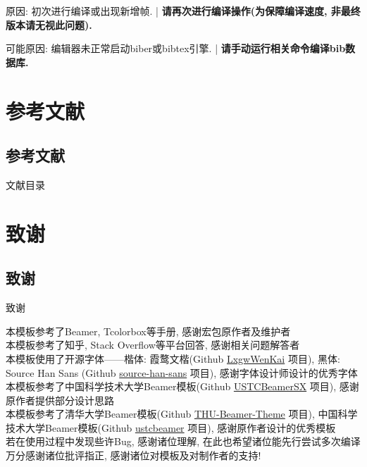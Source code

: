 \documentclass[hyperref, UTF8, CJK, aspectratio=169]{beamer}
\begin{document}
\begin{frame}[allowframebreaks]
  \par
  原因: 初次进行编译或出现新增帧. | \textbf{请再次进行编译操作(为保障编译速度, 非最终版本请无视此问题).}\par\vspace{2ex}
  \par
  可能原因: 编辑器未正常启动biber或bibtex引擎. | \textbf{请手动运行相关命令编译bib数据库.}\par\vspace{2ex}
\end{frame}

\section{参考文献}
\subsection{参考文献}
\begin{frame}[allowframebreaks]{文献目录}
	\nocite{*}
	\printbibliography[heading=none]
\end{frame}

\section{致谢}
\subsection{致谢}
\begin{frame}{致谢}
	\begin{center}
		本模板参考了Beamer, Tcolorbox等手册, 感谢宏包原作者及维护者\\[1ex]
		本模板参考了知乎, Stack Overflow等平台回答, 感谢相关问题解答者\\[1ex]
		本模板使用了开源字体——楷体: 霞鹜文楷(Github \href{https://github.com/lxgw/LxgwWenKai/}{\color{scublue}LxgwWenKai} 项目), 黑体: Source Han Sans (Github \href{https://github.com/adobe-fonts/source-han-sans/}{\color{scublue}source-han-sans} 项目), 感谢字体设计师设计的优秀字体\\[1ex]
		本模板参考了中国科学技术大学Beamer模板(Github \href{https://github.com/ysx2000/USTCBeamerSX/}{\color{scublue}USTCBeamerSX} 项目), 感谢原作者提供部分设计思路\\[1ex]
		本模板参考了清华大学Beamer模板(Github \href{https://github.com/tuna/THU-Beamer-Theme/}{\color{scublue}THU-Beamer-Theme} 项目), 中国科学技术大学Beamer模板(Github \href{https://github.com/ustctug/ustcbeamer/}{\color{scublue}ustcbeamer} 项目), 感谢原作者设计的优秀模板\\[1ex]
		
		若在使用过程中发现些许Bug, 感谢诸位理解, 在此也希望诸位能先行尝试多次编译\\[1ex]
		万分感谢诸位批评指正, 感谢诸位对模板及对制作者的支持!
	\end{center}
\end{frame}
\end{document}
